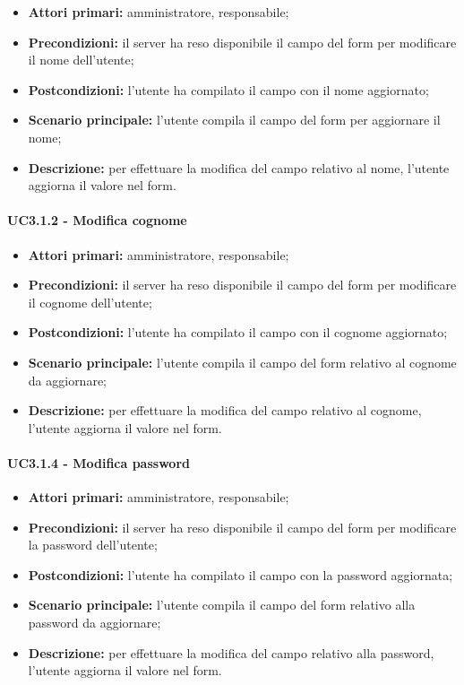 \begin{itemize}
	\item 	\textbf{Attori primari:} amministratore, responsabile;
	\item 	\textbf{Precondizioni:} il server ha reso disponibile il campo del form per modificare il nome dell'utente;
	\item 	\textbf{Postcondizioni:}  l'utente ha compilato il campo con il nome aggiornato;
	\item 	\textbf{Scenario principale:} l'utente compila il campo del form per aggiornare il nome;
	\item 	\textbf{Descrizione:} per effettuare la modifica del campo relativo al nome, l'utente aggiorna il valore nel form.
\end{itemize}

\paragraph{UC3.1.2 - Modifica cognome}

\begin{itemize}
	\item 	\textbf{Attori primari:} amministratore, responsabile;
	\item 	\textbf{Precondizioni:} il server ha reso disponibile il campo del form per modificare il cognome dell'utente;
	\item 	\textbf{Postcondizioni:} l'utente ha compilato il campo con il cognome aggiornato;
	\item 	\textbf{Scenario principale:} l'utente compila il campo del form relativo al cognome da aggiornare;
	\item 	\textbf{Descrizione:} per effettuare la modifica del campo relativo al cognome, l'utente aggiorna il valore nel form.

\end{itemize}

\paragraph{UC3.1.4 - Modifica password}

\begin{itemize}
	\item 	\textbf{Attori primari:} amministratore, responsabile;
	\item 	\textbf{Precondizioni:} il server ha reso disponibile il campo del form per modificare la password dell'utente;
	\item 	\textbf{Postcondizioni:} l'utente ha compilato il campo con la password aggiornata;
	\item 	\textbf{Scenario principale:} l'utente compila il campo del form relativo alla password da aggiornare;
	\item 	\textbf{Descrizione:} per effettuare la modifica del campo relativo alla password, l'utente aggiorna il valore nel form.

\end{itemize}

